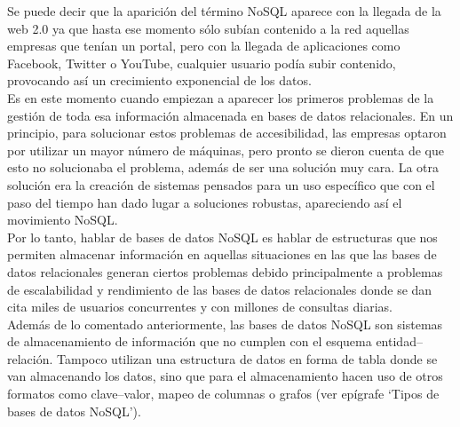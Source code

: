 \documentclass[12pt,a4paper,oneside]{book}
\begin{document}
\begin{enumerate}
\begin{enumerate}
			Se puede decir que la aparición del término NoSQL aparece con la llegada de la web 2.0 ya que hasta ese momento sólo subían contenido a la red aquellas empresas que tenían un portal, pero con la llegada de aplicaciones como Facebook, Twitter o YouTube, cualquier usuario podía subir contenido, provocando así un crecimiento exponencial de los datos.\\
			
			Es en este momento cuando empiezan a aparecer los primeros problemas de la gestión de toda esa información almacenada en bases de datos relacionales. En un principio, para solucionar estos problemas de accesibilidad, las empresas optaron por utilizar un mayor número de máquinas, pero pronto se dieron cuenta de que esto no solucionaba el problema, además de ser una solución muy cara. La otra solución era la creación de sistemas pensados para un uso específico que con el paso del tiempo han dado lugar a soluciones robustas, apareciendo así el movimiento NoSQL.\\
			
			Por lo tanto, hablar de bases de datos NoSQL es hablar de estructuras que nos permiten almacenar información en aquellas situaciones en las que las bases de datos relacionales generan ciertos problemas debido principalmente a problemas de escalabilidad y rendimiento de las bases de datos relacionales donde se dan cita miles de usuarios concurrentes y con millones de consultas diarias.\\
			
			Además de lo comentado anteriormente, las bases de datos NoSQL son sistemas de almacenamiento de información que no cumplen con el esquema entidad–relación. Tampoco utilizan una estructura de datos en forma de tabla donde se van almacenando los datos, sino que para el almacenamiento hacen uso de otros formatos como clave–valor, mapeo de columnas o grafos (ver epígrafe ‘Tipos de bases de datos NoSQL’).\\
			

\end{enumerate}
\end{enumerate}
\end{document}
